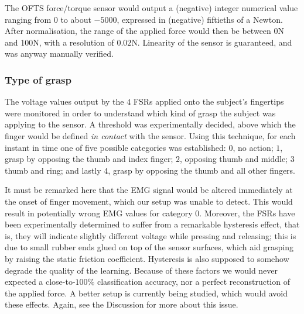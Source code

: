 The OFTS force/torque sensor would output a (negative) integer
numerical value ranging from $0$ to about $-5000$, expressed in
(negative) fiftieths of a Newton. After normalisation, the range of
the applied force would then be between 0N and 100N, with a
resolution of $0.02$N. Linearity of the sensor is guaranteed, and was
anyway manually verified.

\subsubsection{Type of grasp}

The voltage values output by the $4$ FSRs applied onto the subject's
fingertips were monitored in order to understand which kind of grasp
the subject was applying to the sensor. A threshold was experimentally
decided, above which the finger would be defined \emph{in contact}
with the sensor. Using this technique, for each instant in time one of
five possible categories was established: $0$, no action; $1$, grasp
by opposing the thumb and index finger; $2$, opposing thumb and
middle; $3$ thumb and ring; and lastly $4$, grasp by opposing the
thumb and all other fingers.

It must be remarked here that the EMG signal would be altered
immediately at the onset of finger movement, which our setup was
unable to detect. This would result in potentially wrong EMG values for
category $0$. Moreover, the FSRs have been experimentally determined
to suffer from a remarkable hysteresis effect, that is, they will
indicate slightly different voltage while pressing and releasing; this
is due to small rubber ends glued on top of the sensor surfaces, which
aid grasping by raising the static friction coefficient. Hysteresis is
also supposed to somehow degrade the quality of the learning. Because
of these factors we would never expected a close-to-$100\%$
classification accuracy, nor a perfect reconstruction of the applied
force. A better setup is currently being studied, which would avoid
these effects. Again, see the Discussion for more about this issue.
